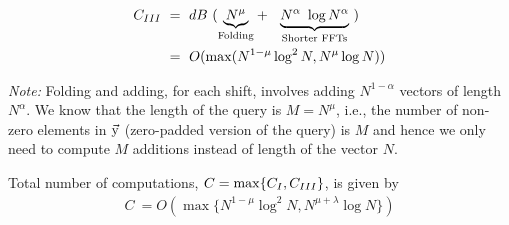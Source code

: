 \begin{enumerate}
	\begin{align*}
	 C_{\RNum{3}} \ &= ~  dB ~ 
	( \underset{\text{Folding} }{\underbrace{N^{\mu}}} + \ \
	\underset{\text{Shorter FFTs} }{\underbrace{N^{\alpha} \ \log N^{\alpha}}} \ )\\
	&= ~O(\max(N^{1-\mu}\log^2 N ,N^{\mu}\log N))
	\end{align*}
	
	{\textit{Note:}} Folding and adding, for each shift, involves adding $N^{1-\alpha}$ vectors of length $N^{\alpha}$. We know that the length of the query is $M =N^{\mu}$, i.e., the number of non-zero elements in $\vec{\mathrm{y}}$ (zero-padded version of the query) is $M$ and hence we only need to compute $M$ additions instead of length of the vector $N$.
	
\end{enumerate}

Total number of computations, $C = \max\{C_{\RNum{1}},C_{\RNum{3}}\} $, is given by   
  \begin{align*}
  C ~ = O\left(\max\{N^{1-\mu}\log^2 N, N^{\mu+\lambda}\log N \}\right)
  \end{align*}
  
